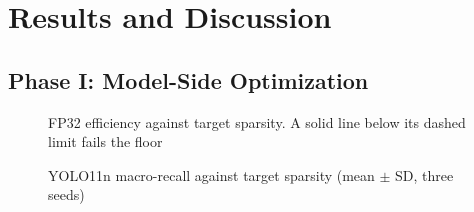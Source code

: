 \documentclass[conference]{IEEEtran}
\begin{document}
\section{Results and Discussion}
\label{sec:results}

\subsection{Phase I: Model-Side Optimization}



\begin{figure}[!t]
\centering

\caption{FP32 efficiency against target sparsity. A solid line below its dashed limit fails the floor}
\label{fig:pruning_efficiency}
\end{figure}



\begin{figure}[!t]
\centering

\caption{YOLO11n macro-recall against target sparsity (mean $\pm$ SD, three seeds)}
\label{fig:quant_macro_recall}
\end{figure}
\end{document}
